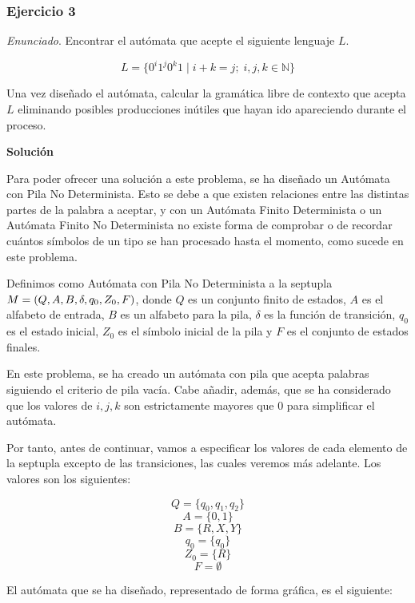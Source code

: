 \documentclass[11pt,a4paper]{article}
\newcommand{\enu}{\textit{Enunciado}}
\newcommand{\sol}{\textbf{Solución}}
\begin{document}
		\subsubsection{Ejercicio 3}
		\enu. Encontrar el autómata que acepte el siguiente lenguaje $L$.
		
		\[L = \lbrace 0^i 1^j 0^k 1 \; | \; i + k = j; \; i, j, k \in \mathbb{N} \rbrace\]
		
		Una vez diseñado el autómata, calcular la gramática libre de contexto que acepta $L$ eliminando posibles producciones
		inútiles que hayan ido apareciendo durante el proceso. \par
		
		\sol \par
		
		Para poder ofrecer una solución a este problema, se ha diseñado un Autómata con Pila No Determinista. Esto se
		debe a que existen relaciones entre las distintas partes de la palabra a aceptar, y con un Autómata Finito
		Determinista o un Autómata Finito No Determinista no existe forma de comprobar o de recordar cuántos símbolos de
		un tipo se han procesado hasta el momento, como sucede en este problema. \par
		
		Definimos como Autómata con Pila No Determinista a la septupla $M = (Q, A, B, \delta, \\q_0, Z_0, F)$, donde $Q$ es un
		conjunto finito de estados, $A$ es el alfabeto de entrada, $B$ es un alfabeto para la pila, $\delta$ es la función
		de transición, $q_0$ es el estado inicial, $Z_0$ es el símbolo inicial de la pila y $F$ es el conjunto de estados
		finales. \par
		
		En este problema, se ha creado un autómata con pila que acepta palabras siguiendo el criterio de pila vacía. 
		Cabe añadir, además, que se ha considerado que los valores de $i, j, k$ son estrictamente mayores que 0 para
		simplificar el autómata. \par
		
		Por tanto, antes de continuar, vamos a especificar los valores de cada elemento de la septupla excepto de las
		transiciones, las cuales veremos más adelante.  Los valores son los siguientes:
		
		\[Q = \{ q_0, q_1, q_2 \} \]
		\[A = \{ 0, 1 \} \]
		\[B = \{ R, X, Y \} \]
		\[q_0 = \{ q_0 \} \]
		\[Z_0 = \{ R \} \]
		\[F = \emptyset \]
		
		El autómata que se ha diseñado, representado de forma gráfica, es el siguiente:
		
\end{document}
